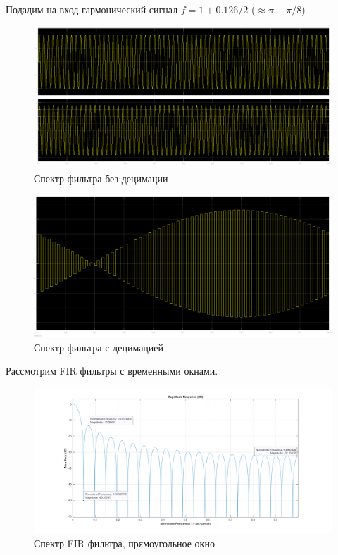 \documentclass[12pt,a4paper]{article}
\begin{document}
	Подадим на вход гармонический сигнал $f = 1 + 0.126/2$ ($\approx \pi + \pi/8$)
	\begin{figure}[H]
		\centering
		\includegraphics[width=1.0\linewidth]{res/4_4_inout_0126.png}
		\caption{Спектр фильтра без децимации}
	\end{figure}
	\begin{figure}[H]
		\centering
		\includegraphics[width=1.0\linewidth]{res/4_4_dcm_0126.png}
		\caption{Спектр фильтра с децимацией}
	\end{figure}

	Рассмотрим FIR фильтры с временными окнами.

	\begin{figure}[H]
		\centering
		\includegraphics[width=1.0\linewidth]{res/4_5_N20_r.png}
		\caption{Спектр FIR фильтра, прямоугольное окно}
	\end{figure}
	
\end{document}
